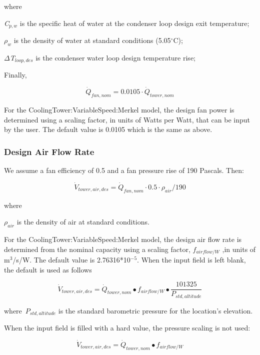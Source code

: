 where

\emph{C\(_{p,w}\)} is the specific heat of water at the condenser loop design exit temperature;

\emph{\(\rho_{w}\)} is the density of water at standard conditions (5.05\(^{\circ}\)C);

\emph{\(\Delta\)T\(_{loop,des}\)} is the condenser water loop design temperature rise;

Finally,

\begin{equation}
\dot Q_{fan,nom} = 0.0105\cdot \dot Q_{tower,nom}
\end{equation}

For the CoolingTower:VariableSpeed:Merkel model, the design fan power is determined using a scaling factor, in units of Watts per Watt, that can be input by the user. The default value is 0.0105 which is the same as above.

\subsubsection{Design Air Flow Rate}\label{design-air-flow-rate}

We assume a fan efficiency of 0.5 and a fan pressure rise of 190 Pascals. Then:

\begin{equation}
\dot V_{tower,air,des} = \dot Q_{fan,nom} \cdot 0.5 \cdot \rho_{air} / 190
\end{equation}

where

\(\rho_{air}\) is the density of air at standard conditions.

For the CoolingTower:VariableSpeed:Merkel model, the design air flow rate is determined from the nominal capacity using a scaling factor, \({f_{airflow/W}}\) ,in units of m\(^{3}\)/s/W. The default value is 2.76316*10\(^{-5}\). When the input field is left blank, the default is used as follows

\begin{equation}
{\dot V_{tower,air,des}} = {\dot Q_{tower,nom}} \bullet {f_{airflow/W}} \bullet \frac{{101325}}{{{P_{std,altitude}}}}
\end{equation}

where~\({P_{std,altitude}}\) is the standard barometric pressure for the location's elevation.

When the input field is filled with a hard value, the pressure scaling is not used:

\begin{equation}
{\dot V_{tower,air,des}} = {\dot Q_{tower,nom}} \bullet {f_{airflow/W}}
\end{equation}

